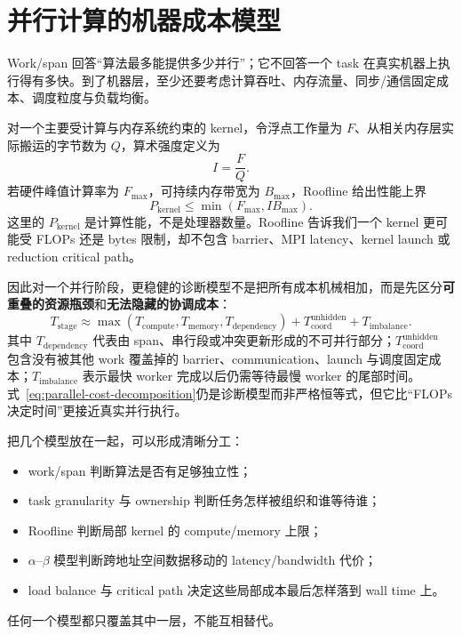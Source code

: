 \section{并行计算的机器成本模型}

Work/span 回答“算法最多能提供多少并行”；它不回答一个 task 在真实机器上执行得有多快。到了机器层，至少还要考虑计算吞吐、内存流量、同步/通信固定成本、调度粒度与负载均衡。

对一个主要受计算与内存系统约束的 kernel，令浮点工作量为 $F$、从相关内存层实际搬运的字节数为 $Q$，算术强度定义为
\begin{equation}
I=\frac{F}{Q}.
\end{equation}
若硬件峰值计算率为 $F_{\max}$，可持续内存带宽为 $B_{\max}$，Roofline 给出性能上界
\begin{equation}
\boxed{
P_{\mathrm{kernel}}
\le
\min(F_{\max},I B_{\max}).
}
\label{eq:parallel-roofline}
\end{equation}
这里的 $P_{\mathrm{kernel}}$ 是计算性能，不是处理器数量。Roofline 告诉我们一个 kernel 更可能受 FLOPs 还是 bytes 限制，却不包含 barrier、MPI latency、kernel launch 或 reduction critical path。

因此对一个并行阶段，更稳健的诊断模型不是把所有成本机械相加，而是先区分\textbf{可重叠的资源瓶颈}和\textbf{无法隐藏的协调成本}：
\begin{equation}
\boxed{
T_{\mathrm{stage}}
\approx
\max\!\left(
T_{\mathrm{compute}},
T_{\mathrm{memory}},
T_{\mathrm{dependency}}
\right)
+T_{\mathrm{coord}}^{\mathrm{unhidden}}
+T_{\mathrm{imbalance}}.
}
\label{eq:parallel-cost-decomposition}
\end{equation}
其中 $T_{\mathrm{dependency}}$ 代表由 span、串行段或冲突更新形成的不可并行部分；$T_{\mathrm{coord}}^{\mathrm{unhidden}}$ 包含没有被其他 work 覆盖掉的 barrier、communication、launch 与调度固定成本；$T_{\mathrm{imbalance}}$ 表示最快 worker 完成以后仍需等待最慢 worker 的尾部时间。式~\eqref{eq:parallel-cost-decomposition}仍是诊断模型而非严格恒等式，但它比“FLOPs 决定时间”更接近真实并行执行。

把几个模型放在一起，可以形成清晰分工：
\begin{itemize}
\item work/span 判断算法是否有足够独立性；
\item task granularity 与 ownership 判断任务怎样被组织和谁等待谁；
\item Roofline 判断局部 kernel 的 compute/memory 上限；
\item $\alpha$--$\beta$ 模型判断跨地址空间数据移动的 latency/bandwidth 代价；
\item load balance 与 critical path 决定这些局部成本最后怎样落到 wall time 上。
\end{itemize}
任何一个模型都只覆盖其中一层，不能互相替代。

